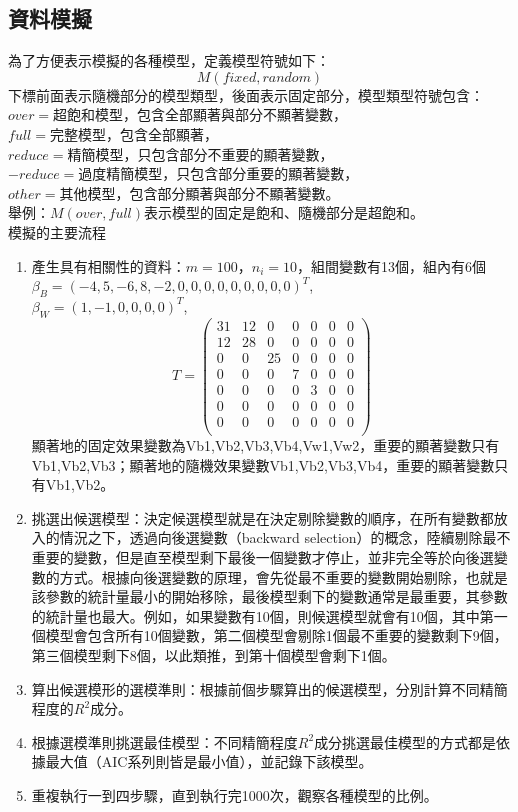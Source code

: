 \subsection{資料模擬}
為了方便表示模擬的各種模型，定義模型符號如下：\\
\[M(fixed,random)\]
下標前面表示隨機部分的模型類型，後面表示固定部分，模型類型符號包含：\\
$over=$超飽和模型，包含全部顯著與部分不顯著變數，\\
$full=$完整模型，包含全部顯著，\\
$reduce=$精簡模型，只包含部分不重要的顯著變數，\\
$-reduce=$過度精簡模型，只包含部分重要的顯著變數，\\
$other=$其他模型，包含部分顯著與部分不顯著變數。\\
舉例：$M(over,full)$表示模型的固定是飽和、隨機部分是超飽和。\\
模擬的主要流程\\
\begin{enumerate}
\item 產生具有相關性的資料：$m=100$，$n_i=10$，組間變數有13個，組內有6個\\
$\beta_B=(-4, 5, -6, 8, -2,0,0,0,0,0,0,0,0,0)^T$,\\
$\beta_W=(1,-1,0,0,0,0)^T$,\\
\[T=\begin{pmatrix}
31&12&0&0&0&0&0\\
12&28&0&0&0&0&0\\
0&0&25&0&0&0&0\\0&0&0&7&0&0&0\\
0&0&0&0&3&0&0\\
0&0&0&0&0&0&0\\
0&0&0&0&0&0&0\\
\end{pmatrix}\]
顯著地的固定效果變數為Vb1,Vb2,Vb3,Vb4,Vw1,Vw2，重要的顯著變數只有Vb1,Vb2,Vb3；顯著地的隨機效果變數Vb1,Vb2,Vb3,Vb4，重要的顯著變數只有Vb1,Vb2。
\item 挑選出候選模型：決定候選模型就是在決定剔除變數的順序，在所有變數都放入的情況之下，透過向後選變數（backward selection）的概念，陸續剔除最不重要的變數，但是直至模型剩下最後一個變數才停止，並非完全等於向後選變數的方式。根據向後選變數的原理，會先從最不重要的變數開始剔除，也就是該參數的統計量最小的開始移除，最後模型剩下的變數通常是最重要，其參數的統計量也最大。例如，如果變數有10個，則候選模型就會有10個，其中第一個模型會包含所有10個變數，第二個模型會剔除1個最不重要的變數剩下9個，第三個模型剩下8個，以此類推，到第十個模型會剩下1個。
\item 算出候選模形的選模準則：根據前個步驟算出的候選模型，分別計算不同精簡程度的$R^2$成分。
\item 根據選模準則挑選最佳模型：不同精簡程度$R^2$成分挑選最佳模型的方式都是依據最大值（AIC系列則皆是最小值），並記錄下該模型。
\item 重複執行一到四步驟，直到執行完1000次，觀察各種模型的比例。
\end{enumerate}\par
